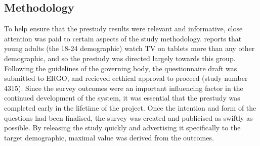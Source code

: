 
\subsection{Methodology}

To help ensure that the prestudy results were relevant and informative, close attention was paid to certain aspects of the study methodology.
\citet{viacom} reports that young adults (the 18-24 demographic) watch TV on tablets more than any other demographic, and so the prestudy was directed largely towards this group. %
Following the guidelines of the governing body, the questionnaire draft was submitted to ERGO, and recieved ecthical approval to proceed (study number 4315). %
Since the survey outcomes were an important influencing factor in the continued development of the system, it was essential that the prestudy was completed early in the lifetime of the project. Once the intention and form of the questions had been finalised, the survey was created and publicised as swiftly as possible.
By releasing the study quickly and advertising it specifically to the target demographic, maximal value was derived from the outcomes. %

